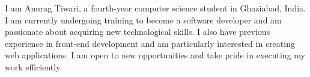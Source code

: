 I am Anurag Tiwari, a fourth-year computer science student in Ghaziabad, India. I am currently undergoing training to become a software developer and am passionate about acquiring new technological skills. I also have previous experience in front-end development and am particularly interested in creating web applications. I am open to new opportunities and take pride in executing my work efficiently.


